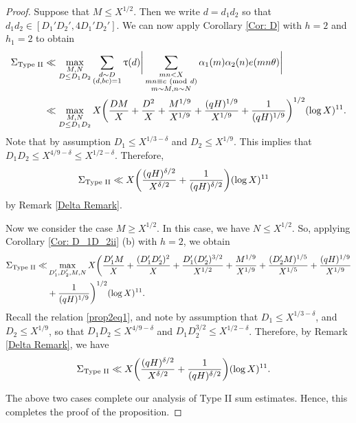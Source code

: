 \documentclass[12pt]{amsart}
\numberwithin{equation}{section}
\theoremstyle{remark}
\theoremstyle{definition}
\newcommand{\imod}[1]{\ (\mathrm{mod}\ #1)}
\begin{document}
\begin{proof}
 Suppose that $M\leq X^{1/2}$. Then we write $d=d_1d_2$ so that $d_1d_2\in [D_1'D_2', 4D_1'D_2']$. We can now apply Corollary \ref{Cor: D} with $h=2$ and $h_1=2$ to obtain
\begin{align}\notag 
\Sigma_{\textup{Type II}} &\ll \max_{\substack{M, N\\ D\leq D_1D_2}}\sum_{\substack{d\sim D\\(d, bc)=1}}\uptau(d)\bigg\lvert\sum_{\substack{mn<X\\mn\equiv c\imod {d}\\m\sim M, n\sim N}}{\alpha}_1(m){\alpha}_2(n)e(mn\theta)\bigg\rvert\\
\notag &\ll \max_{\substack{M, N\\D\leq D_1D_2}}X\bigg(\dfrac{DM}{X} + \dfrac{D^2}{X} + \dfrac{M^{1/9}}{X^{1/9}} + \dfrac{(qH)^{1/9}}{X^{1/9}} + \dfrac{1}{(qH)^{1/9}}\bigg)^{1/2}(\log X)^{11}.
\end{align}
Note that by assumption $D_1\leq X^{1/3-\delta}$ and $D_2\leq X^{1/9}$. This implies that $D_1D_2\leq X^{4/9-\delta} \leq X^{1/2-\delta}$. Therefore,
\begin{align}\notag 
\Sigma_{\textup{Type II}}  &\ll X\bigg(\dfrac{(qH)^{\delta/2}}{X^{\delta/2}} + \dfrac{1}{(qH)^{\delta/2}}\bigg)(\log X)^{11}
\end{align}
by Remark \ref{Delta Remark}.


 Now we consider the case $M\geq X^{1/2}$. In this case, we have $N\leq X^{1/2}$. So,  applying Corollary \ref{Cor: D_1D_2ii} (b) with $h=2$, we obtain
\begin{align}\notag 
\Sigma_{\textup{Type II}} \ll &\max_{\substack{D_1', D_2', M, N}} X\bigg(\dfrac{D_1'M}{X} + \dfrac{(D_1'D_2')^2}{X} + \dfrac{D_1'(D_2')^{3/2}}{X^{1/2}} + \dfrac{M^{1/9}}{X^{1/9}} + \dfrac{(D_2'M)^{1/5}}{X^{1/5}} + \dfrac{(qH)^{1/9}}{X^{1/9}}\\
\notag &+ \dfrac{1}{(qH)^{1/9}}\bigg)^{1/2}(\log X)^{11}.
 \end{align}
Recall the relation \eqref{prop2eq1}, and note by assumption that $D_1\leq X^{1/3-\delta}$, and $D_2\leq X^{1/9}$, so that $D_1D_2\leq X^{4/9-\delta}$ and $D_1D_2^{3/2}\leq X^{1/2-\delta}$. Therefore, by Remark \ref{Delta Remark}, we have
\begin{align}
\notag \Sigma_{\textup{Type II}}&\ll X\bigg(\dfrac{(qH)^{\delta/2}}{X^{\delta/2}} + \dfrac{1}{(qH)^{\delta/2}}\bigg)(\log X)^{11}.
\end{align} 

The above two cases complete our analysis of Type II sum estimates. Hence, this completes the proof of the proposition.
\end{proof}
\end{document}
